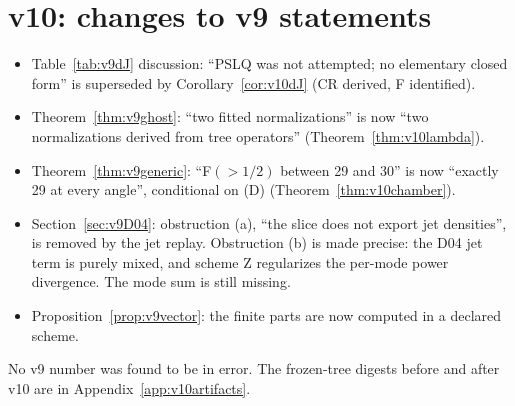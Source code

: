 \section{v10: changes to v9 statements}
\label{sec:v10changes}
\begin{itemize}
\item Table~\ref{tab:v9dJ} discussion: ``PSLQ was not attempted;
no elementary closed form'' is superseded by
Corollary~\ref{cor:v10dJ} (CR derived, F identified).
\item Theorem~\ref{thm:v9ghost}: ``two fitted normalizations'' is
now ``two normalizations derived from tree operators''
(Theorem~\ref{thm:v10lambda}).
\item Theorem~\ref{thm:v9generic}: ``F\((>1/2)\) between 29 and 30''
is now ``exactly 29 at every angle'', conditional on (D)
(Theorem~\ref{thm:v10chamber}).
\item Section~\ref{sec:v9D04}: obstruction (a), ``the slice does not
export jet densities'', is removed by the jet replay. Obstruction
(b) is made precise: the D04 jet term is purely mixed, and scheme Z
regularizes the per-mode power divergence. The mode sum is still
missing.
\item Proposition~\ref{prop:v9vector}: the finite parts are now
computed in a declared scheme.
\end{itemize}
No v9 number was found to be in error. The frozen-tree digests
before and after v10 are in Appendix~\ref{app:v10artifacts}.
